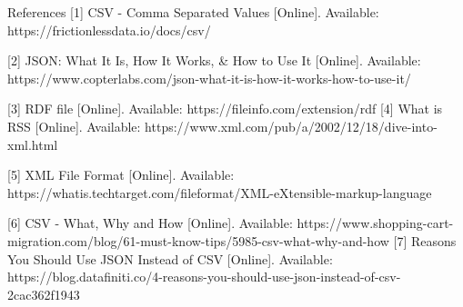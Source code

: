 References
[1] CSV - Comma Separated Values [Online]. Available: https://frictionlessdata.io/docs/csv/

[2] JSON: What It Is, How It Works, & How to Use It [Online]. Available: https://www.copterlabs.com/json-what-it-is-how-it-works-how-to-use-it/

[3] RDF file [Online]. Available: https://fileinfo.com/extension/rdf
[4] What is RSS [Online]. Available: https://www.xml.com/pub/a/2002/12/18/dive-into-xml.html

[5] XML File Format [Online]. Available:
https://whatis.techtarget.com/fileformat/XML-eXtensible-markup-language

[6] CSV - What, Why and How [Online]. Available:
https://www.shopping-cart-migration.com/blog/61-must-know-tips/5985-csv-what-why-and-how
[7] Reasons You Should Use JSON Instead of CSV [Online]. Available: https://blog.datafiniti.co/4-reasons-you-should-use-json-instead-of-csv-2cac362f1943
